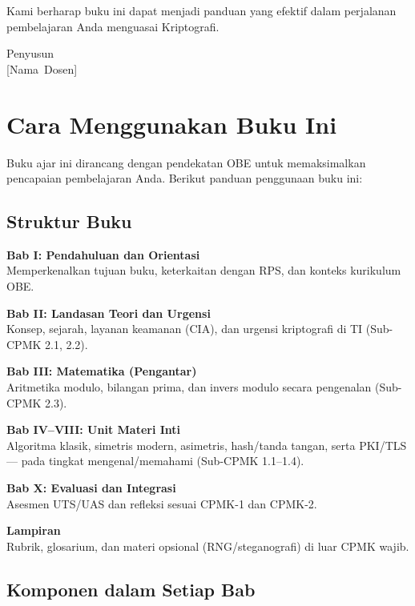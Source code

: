 \documentclass[main.tex]{subfiles}
\begin{document}
Kami berharap buku ini dapat menjadi panduan yang efektif dalam perjalanan pembelajaran Anda menguasai Kriptografi.

\vspace{1cm}
\begin{flushright}
Penyusun\\
\mbox{[Nama Dosen]}
\end{flushright}

\cleardoublepage

\chapter*{Cara Menggunakan Buku Ini}

Buku ajar ini dirancang dengan pendekatan OBE untuk memaksimalkan pencapaian pembelajaran Anda. Berikut panduan penggunaan buku ini:

\section*{Struktur Buku}

\textbf{Bab I: Pendahuluan dan Orientasi}\\
Memperkenalkan tujuan buku, keterkaitan dengan RPS, dan konteks kurikulum OBE.

\textbf{Bab II: Landasan Teori dan Urgensi}\\
Konsep, sejarah, layanan keamanan (CIA), dan urgensi kriptografi di TI (Sub-CPMK 2.1, 2.2).

\textbf{Bab III: Matematika (Pengantar)}\\
Aritmetika modulo, bilangan prima, dan invers modulo secara pengenalan (Sub-CPMK 2.3).

\textbf{Bab IV--VIII: Unit Materi Inti}\\
Algoritma klasik, simetris modern, asimetris, hash/tanda tangan, serta PKI/TLS --- pada tingkat mengenal/memahami (Sub-CPMK 1.1--1.4).

\textbf{Bab X: Evaluasi dan Integrasi}\\
Asesmen UTS/UAS dan refleksi sesuai CPMK-1 dan CPMK-2.

\textbf{Lampiran}\\
Rubrik, glosarium, dan materi opsional (RNG/steganografi) di luar CPMK wajib.

\section*{Komponen dalam Setiap Bab}
\end{document}
